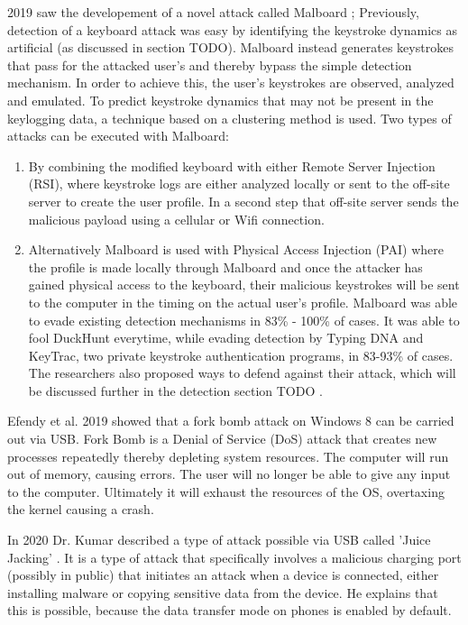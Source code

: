\label{malboard}2019 saw the developement of a novel attack called Malboard \cite{farhiMalboardNovelUser2019}; Previously, detection of a keyboard attack was easy by identifying the keystroke dynamics as artificial (as discussed in section TODO). Malboard instead generates keystrokes that pass for the attacked user's and thereby bypass the simple detection mechanism. In order to achieve this, the user's keystrokes are observed, analyzed and emulated. To predict keystroke dynamics that may not be present in the keylogging data, a technique based on a clustering method is used. Two types of attacks can be executed with Malboard: 
\begin{enumerate}
    \item By combining the modified keyboard with either Remote Server Injection (RSI), where keystroke logs are either analyzed locally or sent to the off-site server to create the user profile. In a second step that off-site server sends the malicious payload using a cellular or Wifi connection. 
    \item Alternatively Malboard is used with Physical Access Injection (PAI) where the profile is made locally through Malboard and once the attacker has gained physical access to the keyboard, their malicious keystrokes will be sent to the computer in the timing on the actual user's profile. 
 Malboard was able to evade existing detection mechanisms in 83\% - 100\% of cases. It was able to fool DuckHunt everytime, while evading detection by Typing DNA and KeyTrac, two private keystroke authentication programs, in 83-93\% of cases. The researchers also proposed ways to defend against their attack, which will be discussed further in the detection section TODO .
\end{enumerate}

Efendy et al. 2019 \cite{efendyExploringPossibilityUSB2019} showed that a fork bomb attack on Windows 8 can be carried out via USB. Fork Bomb is a Denial of Service (DoS) attack that creates new processes repeatedly thereby depleting system resources. The computer will run out of memory, causing errors. The user will no longer be able to give any input to the computer. Ultimately it will exhaust the resources of the OS, overtaxing the kernel causing a crash.  

In 2020 Dr. Kumar described a type of attack possible via USB called 'Juice Jacking' \cite{kumarJuiceJackingUSB2020}. It is a type of attack that specifically involves a malicious charging port (possibly in public) that initiates an attack when a device is connected, either installing malware or copying sensitive data from the device. He explains that this is possible, because the data transfer mode on phones is enabled by default. 

